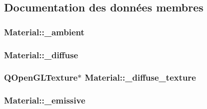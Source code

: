 \subsection{Documentation des données membres}
\hypertarget{class_material_a4c29044a3f7e8008eb3a0666c4ce09b9}{
\subsubsection[{\+\_\+ambient}]{ Material\+::\+\_\+ambient\hspace{0.3cm}{\ttfamily [private]}}}\label{class_material_a4c29044a3f7e8008eb3a0666c4ce09b9}
\hypertarget{class_material_a402005729d7d5a147d51dfcd691d2ffa}{
\subsubsection[{\+\_\+diffuse}]{ Material\+::\+\_\+diffuse\hspace{0.3cm}{\ttfamily [private]}}}\label{class_material_a402005729d7d5a147d51dfcd691d2ffa}
\hypertarget{class_material_a522d07896a1363e987d09d8e4b66c156}{
\subsubsection[{\+\_\+diffuse\+\_\+texture}]{\setlength{\rightskip}{0pt plus 5cm}Q\+Open\+G\+L\+Texture$\ast$ Material\+::\+\_\+diffuse\+\_\+texture\hspace{0.3cm}{\ttfamily [private]}}}\label{class_material_a522d07896a1363e987d09d8e4b66c156}
\hypertarget{class_material_a7c2eb5e499b3f46ec6e9d62f02653879}{
\subsubsection[{\+\_\+emissive}]{ Material\+::\+\_\+emissive\hspace{0.3cm}{\ttfamily [private]}}}\label{class_material_a7c2eb5e499b3f46ec6e9d62f02653879}
